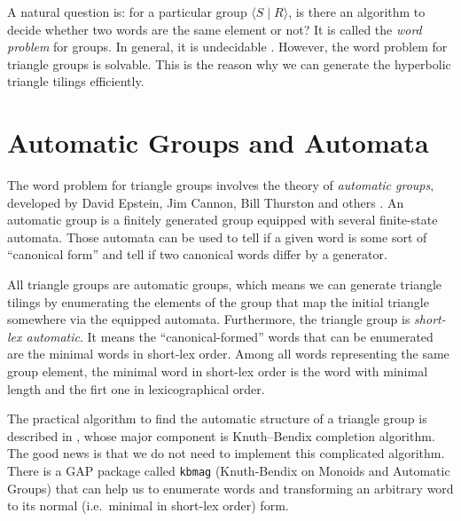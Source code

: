 \documentclass[12pt]{article}
\begin{document}
A natural question is: for a particular group $\langle S \mid R
\rangle$, is there an algorithm to decide whether two words are the
same element or not? It is called the \emph{word problem} for
groups. In general, it is undecidable
\citep{novikov1958algorithmic}. However, the word problem for triangle
groups is solvable. This is the reason why we can generate the
hyperbolic triangle tilings efficiently.

\section{Automatic Groups and Automata}
The word problem for triangle groups involves the theory of
\emph{automatic groups}, developed by David Epstein, Jim Cannon, Bill
Thurston and others \citep{epstein1992}. An automatic group is a
finitely generated group equipped with several finite-state
automata. Those automata can be used to tell if a given word is some
sort of ``canonical form'' and tell if two canonical words differ by a
generator.

All triangle groups are automatic groups, which means we can generate
triangle tilings by enumerating the elements of the group that map the
initial triangle somewhere via the equipped automata. Furthermore, the
triangle group is \emph{short-lex automatic}. It means the
``canonical-formed'' words that can be enumerated are the minimal
words in short-lex order. Among all words representing the same group
element, the minimal word in short-lex order is the word with minimal
length and the firt one in lexicographical order.

The practical algorithm to find the automatic structure of a triangle
group is described in \citep{epstein1991}, whose major component is
Knuth--Bendix completion algorithm. The good news is that we do not
need to implement this complicated algorithm. There is a
GAP\citep{GAP4} package called \verb|kbmag| (Knuth-Bendix on Monoids
and Automatic Groups) that can help us to enumerate words and
transforming an arbitrary word to its normal (i.e.\ minimal in
short-lex order) form.



\end{document}
